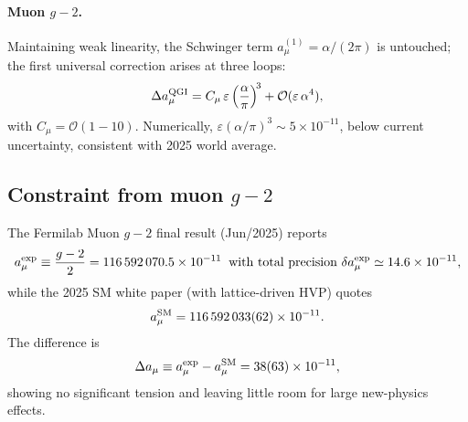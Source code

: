 \documentclass{article}
\numberwithin{equation}{section}
\theoremstyle{plain}
\theoremstyle{definition}
\theoremstyle{remark}
\begin{document}
\paragraph{Muon $g\!-\!2$.}
Maintaining weak linearity, the Schwinger term $a_\mu^{(1)}=\alpha/(2\pi)$ is untouched; the first universal correction arises at three loops:
\[
\Delta a_\mu^{\rm QGI}=C_\mu\,\varepsilon\left(\frac{\alpha}{\pi}\right)^{\!3}+\mathcal{O}(\varepsilon\,\alpha^4),
\]
with $C_\mu=\mathcal{O}(1\!-\!10)$. Numerically, $\varepsilon(\alpha/\pi)^3\sim 5\times10^{-11}$, below current uncertainty, consistent with 2025 world average.

\subsection{Constraint from muon \texorpdfstring{$g-2$}{g-2}}
\label{sec:gminus2}

The Fermilab Muon $g\!-\!2$ final result (Jun/2025) reports
\begin{equation}
  a_\mu^{\rm exp} \equiv \frac{g-2}{2}
  = 116\,592\,070.5 \times 10^{-11}
  \;\;\text{with total precision } \delta a_\mu^{\rm exp}\simeq 14.6\times10^{-11},
\end{equation}
while the 2025 SM white paper (with lattice-driven HVP) quotes
\begin{equation}
  a_\mu^{\rm SM} = 116\,592\,033(62)\times 10^{-11}.
\end{equation}
The difference is
\begin{equation}
  \Delta a_\mu \equiv a_\mu^{\rm exp}-a_\mu^{\rm SM}
  = 38(63)\times10^{-11},
\end{equation}
showing no significant tension and leaving little room for large new-physics effects.
\end{document}
